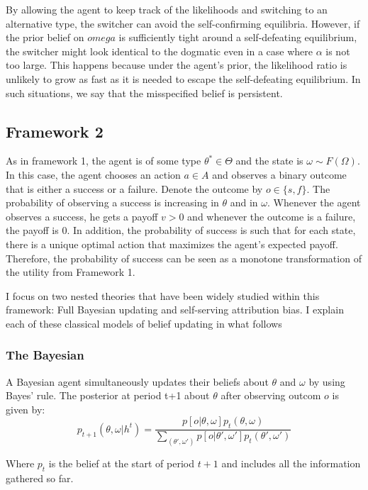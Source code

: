 \documentclass[
  12pt,
]{article}
\begin{document}
By allowing the agent to keep track of the likelihoods and switching to
an alternative type, the switcher can avoid the self-confirming
equilibria. However, if the prior belief on \(omega\) is sufficiently
tight around a self-defeating equilibrium, the switcher might look
identical to the dogmatic even in a case where \(\alpha\) is not too
large. This happens because under the agent's prior, the likelihood
ratio is unlikely to grow as fast as it is needed to escape the
self-defeating equilibrium. In such situations, we say that the
misspecified belief is persistent.

\hypertarget{framework-2}{%
\subsection{Framework 2}\label{framework-2}}

As in framework 1, the agent is of some type \(\theta^* \in \Theta\) and
the state is \(\omega \sim F(\Omega)\). In this case, the agent chooses
an action \(a\in A\) and observes a binary outcome that is either a
success or a failure. Denote the outcome by \(o \in \{s,f\}\). The
probability of observing a success is increasing in \(\theta\) and in
\(\omega\). Whenever the agent observes a success, he gets a payoff
\(v>0\) and whenever the outcome is a failure, the payoff is 0. In
addition, the probability of success is such that for each state, there
is a unique optimal action that maximizes the agent's expected payoff.
Therefore, the probability of success can be seen as a monotone
transformation of the utility from Framework 1.

I focus on two nested theories that have been widely studied within this
framework: Full Bayesian updating and self-serving attribution bias. I
explain each of these classical models of belief updating in what
follows

\hypertarget{the-bayesian}{%
\subsubsection{The Bayesian}\label{the-bayesian}}

A Bayesian agent simultaneously updates their beliefs about \(\theta\)
and \(\omega\) by using Bayes' rule. The posterior at period t+1 about
\(\theta\) after observing outcom \(o\) is given by: \[
p_{t+1}(\theta, \omega| h^t) = \frac{p[o|\theta, \omega]p_t(\theta, \omega)}{\sum_{(\theta', \omega')}p[o|\theta', \omega']p_t(\theta', \omega')}
\]

Where \(p_{t}\) is the belief at the start of period \(t+1\) and
includes all the information gathered so far.
\end{document}
